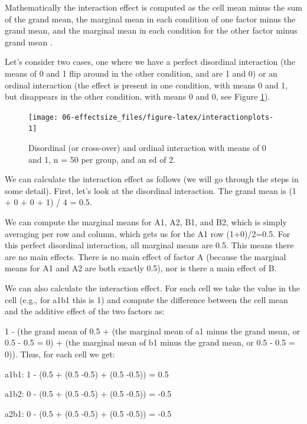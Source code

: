 \documentclass[
]{krantz}
\begin{document}
Mathematically the interaction effect is computed as the cell mean minus the sum of the grand mean, the marginal mean in each condition of one factor minus the grand mean, and the marginal mean in each condition for the other factor minus grand mean \citep{maxwell_designing_2004}.

Let's consider two cases, one where we have a perfect disordinal interaction (the means of 0 and 1 flip around in the other condition, and are 1 and 0) or an ordinal interaction (the effect is present in one condition, with means 0 and 1, but disappears in the other condition, with means 0 and 0, see Figure \ref{fig:interactionplots}).

\begin{figure}

{\centering \texttt{[image: 06-effectsize\_files/figure-latex/interactionplots-1]} 

}

\caption{Disordinal (or cross-over) and ordinal interaction with means of 0 and 1, n = 50 per group, and an sd of 2.}\label{fig:interactionplots}
\end{figure}

We can calculate the interaction effect as follows (we will go through the steps in some detail). First, let's look at the disordinal interaction. The grand mean is (1 + 0 + 0 + 1) / 4 = 0.5.

We can compute the marginal means for A1, A2, B1, and B2, which is simply averaging per row and column, which gets us for the A1 row (1+0)/2=0.5. For this perfect disordinal interaction, all marginal means are 0.5. This means there are no main effects. There is no main effect of factor A (because the marginal means for A1 and A2 are both exactly 0.5), nor is there a main effect of B.

We can also calculate the interaction effect. For each cell we take the value in the cell (e.g., for a1b1 this is 1) and compute the difference between the cell mean and the additive effect of the two factors as:

1 - (the grand mean of 0.5 + (the marginal mean of a1 minus the grand mean, or 0.5 - 0.5 = 0) + (the marginal mean of b1 minus the grand mean, or 0.5 - 0.5 = 0)). Thus, for each cell we get:

a1b1: 1 - (0.5 + (0.5 -0.5) + (0.5 -0.5)) = 0.5

a1b2: 0 - (0.5 + (0.5 -0.5) + (0.5 -0.5)) = -0.5

a2b1: 0 - (0.5 + (0.5 -0.5) + (0.5 -0.5)) = -0.5
\end{document}

